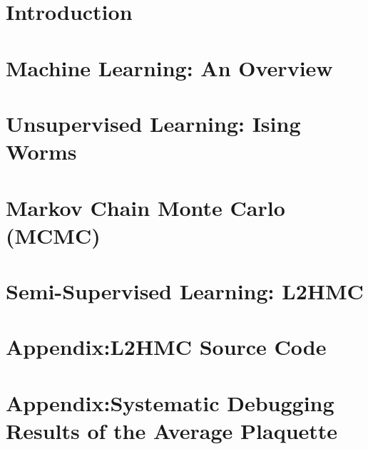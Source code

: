 \documentclass[11pt,notitlepage]{report}
\begin{document}
\begin{doublespace}

\chapter{Introduction}%
\label{chap:introduction}


\chapter{Machine Learning: An Overview}%
\label{chap:machine_learning}


\chapter{Unsupervised Learning: Ising Worms}%
\label{chap:unsupervised_learning}

%
\chapter{Markov Chain Monte Carlo (MCMC)}%
\label{chap:mcmc}


\chapter{Semi-Supervised Learning: L2HMC}%
\label{chap:l2hmc}


% 
% 
% 

% 
% 
% 

% 
\end{doublespace}

\begin{appendix}
%
\chapter{Appendix:\@ L2HMC Source Code}%
\label{chap:l2hmc_source_code}

% 
\chapter{Appendix:\@ Systematic Debugging Results of the Average Plaquette}%
\label{chap:debugging_results}
% 

%
\end{appendix}

\clearpage
\printbibliography[title={References}, heading=bibintoc]
\end{document}
